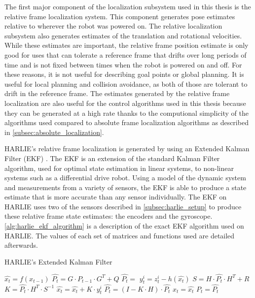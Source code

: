 The first major component of the localization subsystem used in this thesis is the relative frame localization system. This component generates pose estimates relative to wherever the robot was powered on. The relative localization subsystem also generates estimates of the translation and rotational velocities. While these estimates are important, the relative frame position estimate is only good for uses that can tolerate a reference frame that drifts over long periods of time and is not fixed between times when the robot is powered on and off. For these reasons, it is not useful for describing goal points or global planning. It is useful for local planning and collision avoidance, as both of those are tolerant to drift in the reference frame. The estimates generated by the relative frame localization are also useful for the control algorithms used in this thesis because they can be generated at a high rate thanks to the computional simplicity of the algorithms used compared to absolute frame localization algorithms as described in \autoref{subsec:absolute_localization}.

HARLIE's relative frame localization is generated by using an Extended Kalman Filter (EKF) \autocites{Larsen1999}{Welch95anintroduction}{ProbRobotics}. The EKF is an extension of the standard Kalman Filter algorithm, used for optimal state estimation in linear systems, to non-linear systems such as a differential drive robot. Using a model of the dynamic system and measurements from a variety of sensors, the EKF is able to produce a state estimate that is more accurate than any sensor individually. The EKF on HARLIE uses two of the sensors described in \autoref{subsec:harlie_setup} to produce these relative frame state estimates: the encoders and the gyroscope. \autoref{alg:harlie_ekf_algorithm} is a description of the exact EKF algorithm used on HARLIE. The values of each set of matrices and functions used are detailed afterwards.

\begin{algorithm}
\caption{HARLIE's Extended Kalman Filter}
\label{alg:harlie_ekf_algorithm}
\DontPrintSemicolon
{}


$\hat{x_t} = f(x_{t-1})$\;
$\hat{P_t} = G \cdot P_{t-1} \cdot G^T + Q$\;
$\hat{P_t} = $ \;
{
	$y^i_t = z^i_t - h(\hat{x_t})$\;
	$S = H \cdot \hat{P_t} \cdot H^T + R$\;
	$K = \hat{P_t} \cdot H^T \cdot S^{-1}$\;
	$\hat{x_t} = \hat{x_t} + K \cdot y^i_t$\;
	$\hat{P_t} = \left(I - K \cdot H \right) \cdot \hat{P_t}$\;
}
$x_t = \hat{x_t}$\;
$P_t = \hat{P_t}$\;
\end{algorithm}

